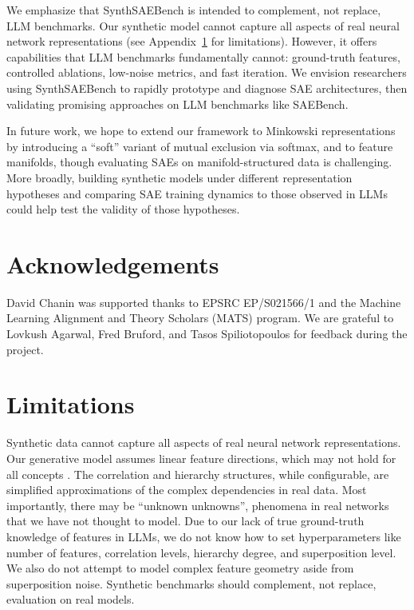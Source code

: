 \documentclass{article}
\theoremstyle{plain}
\theoremstyle{definition}
\theoremstyle{remark}
\begin{document}
We emphasize that SynthSAEBench is intended to complement, not replace, LLM benchmarks. Our synthetic model cannot capture all aspects of real neural network representations (see Appendix~\ref{apx:limitations} for limitations). However, it offers capabilities that LLM benchmarks fundamentally cannot: ground-truth features, controlled ablations, low-noise metrics, and fast iteration. We envision researchers using SynthSAEBench to rapidly prototype and diagnose SAE architectures, then validating promising approaches on LLM benchmarks like SAEBench.

In future work, we hope to extend our framework to Minkowski representations~\citep{fel2025into} by introducing a ``soft'' variant of mutual exclusion via softmax, and to feature manifolds, though evaluating SAEs on manifold-structured data is challenging. More broadly, building synthetic models under different representation hypotheses and comparing SAE training dynamics to those observed in LLMs could help test the validity of those hypotheses.

\section*{Acknowledgements}
David Chanin was supported thanks to EPSRC EP/S021566/1 and the Machine Learning Alignment and Theory Scholars (MATS) program. We are grateful to Lovkush Agarwal, Fred Bruford, and Tasos Spiliotopoulos for feedback during the project.





\appendix


\section{Limitations}
\label{apx:limitations}

Synthetic data cannot capture all aspects of real neural network representations. Our generative model assumes linear feature directions, which may not hold for all concepts \citep{engels2025not}. The correlation and hierarchy structures, while configurable, are simplified approximations of the complex dependencies in real data. Most importantly, there may be ``unknown unknowns'', phenomena in real networks that we have not thought to model. Due to our lack of true ground-truth knowledge of features in LLMs, we do not know how to set hyperparameters like number of features, correlation levels, hierarchy degree, and superposition level. We also do not attempt to model complex feature geometry aside from superposition noise. Synthetic benchmarks should complement, not replace, evaluation on real models.
\end{document}
